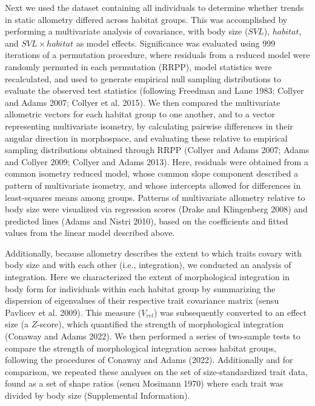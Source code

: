 \documentclass[
  11pt,
]{article}
\begin{document}
Next we used the dataset containing all individuals to determine whether
trends in static allometry differed across habitat groups. This was
accomplished by performing a multivariate analysis of covariance, with
body size (\(SVL\)), \(habitat\), and \(SVL\times habitat\) as model
effects. Significance was evaluated using 999 iterations of a
permutation procedure, where residuals from a reduced model were
randomly permuted in each permutation (RRPP), model statistics were
recalculated, and used to generate empirical null sampling distributions
to evaluate the observed test statistics (following Freedman and Lane
1983; Collyer and Adams 2007; Collyer et al. 2015). We then compared the
multivariate allometric vectors for each habitat group to one another,
and to a vector representing multivariate isometry, by calculating
pairwise differences in their angular direction in morphospace, and
evaluating these relative to empirical sampling distributions obtained
through RRPP (Collyer and Adams 2007; Adams and Collyer 2009; Collyer
and Adams 2013). Here, residuals were obtained from a common isometry
reduced model, whose common slope component described a pattern of
multivariate isometry, and whose intercepts allowed for differences in
least-squares means among groups. Patterns of multivariate allometry
relative to body size were visualized via regression scores (Drake and
Klingenberg 2008) and predicted lines (Adams and Nistri 2010), based on
the coefficients and fitted values from the linear model described
above. \hfill\break

Additionally, because allometry describes the extent to which traits
covary with body size and with each other (i.e., integration), we
conducted an analysis of integration. Here we characterized the extent
of morphological integration in body form for individuals within each
habitat group by summarizing the dispersion of eigenvalues of their
respective trait covariance matrix (sensu Pavlicev et al. 2009). This
measure (\(V_{rel}\)) was subsequently converted to an effect size (a
\(Z\)-score), which quantified the strength of morphological integration
(Conaway and Adams 2022). We then performed a series of two-sample tests
to compare the strength of morphological integration across habitat
groups, following the procedures of Conaway and Adams (2022).
Additionally and for comparison, we repeated these analyses on the set
of size-standardized trait data, found as a set of shape ratios (sensu
Mosimann 1970) where each trait was divided by body size (Supplemental
Information). \hfill\break
\end{document}
